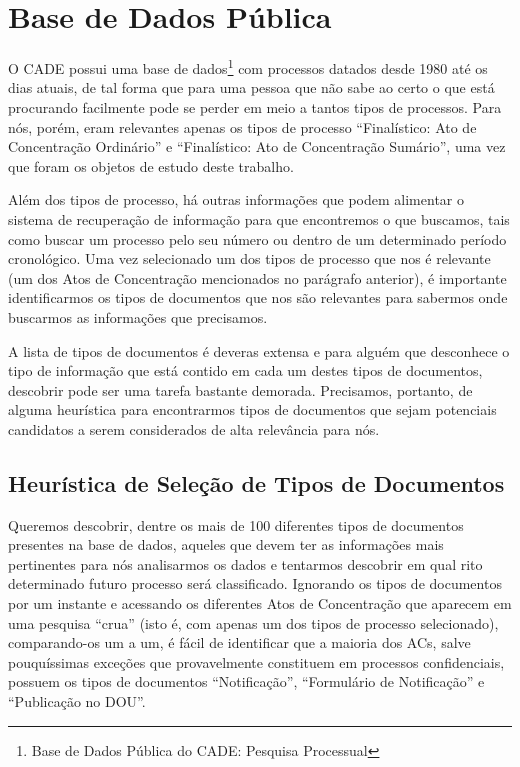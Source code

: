\documentclass[11pt]{report}
\newcommand{\quotes}[1]{``#1''}
\begin{document}
\section{Base de Dados Pública}

\indent\indent O CADE possui uma base de dados\footnote[5]{Base de Dados Pública do CADE: Pesquisa Processual} com processos datados desde 1980 até os dias atuais, de tal forma que
para uma pessoa que não sabe ao certo o que está procurando facilmente pode se perder em meio a tantos tipos de processos. Para nós, porém, eram relevantes apenas
os tipos de processo \quotes{Finalístico: Ato de Concentração Ordinário} e \quotes{Finalístico: Ato de Concentração Sumário}, uma vez que foram os objetos de estudo deste trabalho.

Além dos tipos de processo, há outras informações que podem alimentar o sistema de recuperação de informação para que encontremos o que buscamos, tais como buscar um processo pelo
seu número ou dentro de um determinado período cronológico. Uma vez selecionado um dos tipos de processo que nos é relevante (um dos Atos de Concentração mencionados no parágrafo
anterior), é importante identificarmos os tipos de documentos que nos são relevantes para sabermos onde buscarmos as informações que precisamos.

A lista de tipos de documentos é deveras extensa e para alguém que desconhece o tipo de informação que está contido em cada um destes tipos de documentos, descobrir pode ser uma tarefa
bastante demorada. Precisamos, portanto, de alguma heurística para encontrarmos tipos de documentos que sejam potenciais candidatos a serem considerados de alta relevância para nós.

\subsection{Heurística de Seleção de Tipos de Documentos}

\indent\indent Queremos descobrir, dentre os mais de 100 diferentes tipos de documentos presentes na base de dados, aqueles que devem
ter as informações mais pertinentes para nós analisarmos os dados e tentarmos descobrir em qual rito determinado futuro processo será classificado.
Ignorando os tipos de documentos por um instante e acessando os diferentes Atos de Concentração que aparecem em uma pesquisa \quotes{crua} (isto é, com apenas um dos tipos de
processo selecionado), comparando-os um a um, é fácil de identificar que a maioria dos ACs, salve pouquíssimas exceções que provavelmente constituem em processos confidenciais,
possuem os tipos de documentos \quotes{Notificação}, \quotes{Formulário de Notificação} e \quotes{Publicação no DOU}.
\end{document}
